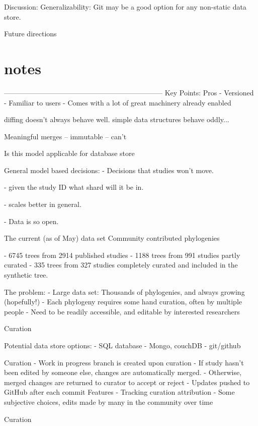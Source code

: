 \documentclass{bioinfo}
\begin{document}
 Discussion:
   Generalizability:
      Git may be a good option for any non-static data store.
      
  Future directions

  
  



\section{notes}
  --------------------------------------------------------------------
Key Points:
Pros
 - Versioned
 - Familiar to users
 - Comes with a lot of great machinery already enabled

diffing doesn't always behave well.
simple data structures behave oddly...

Meaningful merges
 -- immutable 
 -- can't

Is this model applicable for database store

General model based decisions:
- Decisions that studies won't move.

- given the study ID what shard will it be in.

- scales better in general.

- Data is so open.



 The current (as of May) data set
 Community contributed phylogenies

 - 6745 trees from 2914 published studies
 - 1188 trees from 991 studies partly curated 
 - 335 trees from 327 studies completely curated and included in the synthetic tree.

 The problem:
 - Large data set: Thousands of phylogenies, and always growing (hopefully!)
 - Each phylogeny requires some hand curation, often by multiple people
 - Need to be readily accessible, and editable by interested researchers

Curation

 Potential data store options:
 - SQL database
 - Mongo, couchDB
 - git/github

 Curation
- Work in progress branch is created upon curation  
- If study hasn't been edited by someone else, changes are automatically merged.  
- Otherwise, merged changes are returned to curator to accept or reject
- Updates pushed to GitHub after each commit
 Features
 - Tracking curation attribution  
- Some subjective choices, edits made by many in the community over time

 Curation
\end{document}
